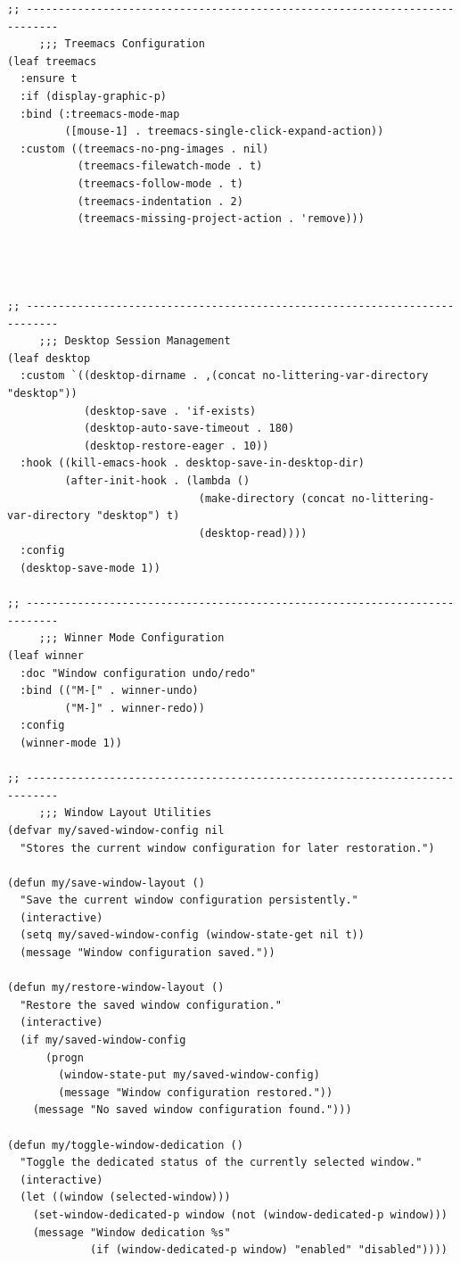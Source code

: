 \documentclass[11pt]{article}
\begin{document}
\begin{verbatim}
;; ---------------------------------------------------------------------------
     ;;; Treemacs Configuration
(leaf treemacs
  :ensure t
  :if (display-graphic-p)
  :bind (:treemacs-mode-map
         ([mouse-1] . treemacs-single-click-expand-action))
  :custom ((treemacs-no-png-images . nil)
           (treemacs-filewatch-mode . t)
           (treemacs-follow-mode . t)
           (treemacs-indentation . 2)
           (treemacs-missing-project-action . 'remove)))




;; ---------------------------------------------------------------------------
     ;;; Desktop Session Management
(leaf desktop
  :custom `((desktop-dirname . ,(concat no-littering-var-directory "desktop"))
            (desktop-save . 'if-exists)
            (desktop-auto-save-timeout . 180)
            (desktop-restore-eager . 10))
  :hook ((kill-emacs-hook . desktop-save-in-desktop-dir)
         (after-init-hook . (lambda ()
                              (make-directory (concat no-littering-var-directory "desktop") t)
                              (desktop-read))))
  :config
  (desktop-save-mode 1))

;; ---------------------------------------------------------------------------
     ;;; Winner Mode Configuration
(leaf winner
  :doc "Window configuration undo/redo"
  :bind (("M-[" . winner-undo)
         ("M-]" . winner-redo))
  :config
  (winner-mode 1))

;; ---------------------------------------------------------------------------
     ;;; Window Layout Utilities
(defvar my/saved-window-config nil
  "Stores the current window configuration for later restoration.")

(defun my/save-window-layout ()
  "Save the current window configuration persistently."
  (interactive)
  (setq my/saved-window-config (window-state-get nil t))
  (message "Window configuration saved."))

(defun my/restore-window-layout ()
  "Restore the saved window configuration."
  (interactive)
  (if my/saved-window-config
      (progn
        (window-state-put my/saved-window-config)
        (message "Window configuration restored."))
    (message "No saved window configuration found.")))

(defun my/toggle-window-dedication ()
  "Toggle the dedicated status of the currently selected window."
  (interactive)
  (let ((window (selected-window)))
    (set-window-dedicated-p window (not (window-dedicated-p window)))
    (message "Window dedication %s"
             (if (window-dedicated-p window) "enabled" "disabled"))))
\end{verbatim}
\end{document}

